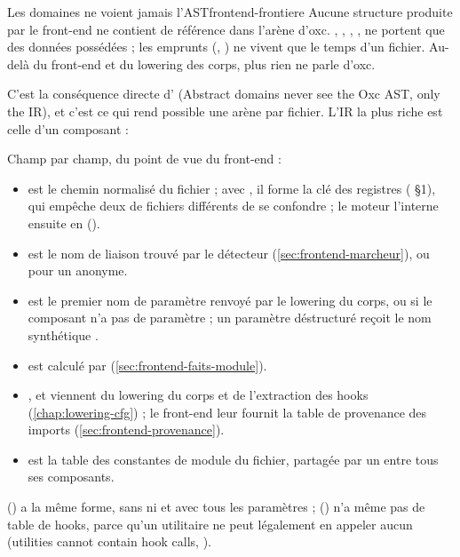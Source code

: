 \begin{invariant}{Les domaines ne voient jamais l'AST}{frontend-frontiere}
Aucune structure produite par le front-end ne contient de référence dans l'arène d'oxc. , , , ,  ne portent que des données possédées ; les emprunts (, ) ne vivent que le temps d'un fichier. Au-delà du front-end et du lowering des corps, plus rien ne parle d'oxc.
\end{invariant}

C'est la conséquence directe d' (\og Abstract domains never see the Oxc AST, only the IR\fg{}), et c'est ce qui rend possible une arène par fichier. L'IR la plus riche est celle d'un composant :


Champ par champ, du point de vue du front-end :
\begin{itemize}
  \item {} est le chemin normalisé du fichier ; avec , il forme la clé  des registres ( §1), qui empêche deux  de fichiers différents de se confondre ; le moteur l'interne ensuite en  ().
  \item {} est le nom de liaison trouvé par le détecteur (\cref{sec:frontend-marcheur}), ou  pour un  anonyme.
  \item {} est le premier nom de paramètre renvoyé par le lowering du corps, ou  si le composant n'a pas de paramètre ; un paramètre déstructuré reçoit le nom synthétique .
  \item {} est calculé par  (\cref{sec:frontend-faits-module}).
  \item {},  et  viennent du lowering du corps et de l'extraction des hooks (\cref{chap:lowering-cfg}) ; le front-end leur fournit la table de provenance des imports (\cref{sec:frontend-provenance}).
  \item {} est la table des constantes de module du fichier, partagée par un  entre tous ses composants.
\end{itemize}
 () a la même forme, sans  ni  et avec tous les paramètres ;  () n'a même pas de table de hooks, parce qu'un utilitaire ne peut légalement en appeler aucun (\og utilities cannot contain hook calls\fg{}, ).

